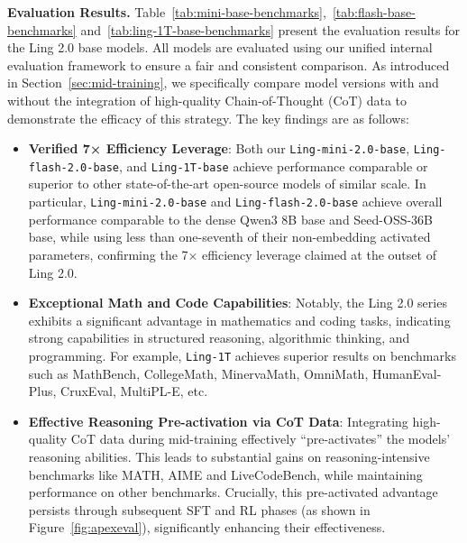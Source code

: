 {\bfseries Evaluation Results.} 
Table~\ref{tab:mini-base-benchmarks},~\ref{tab:flash-base-benchmarks} and~\ref{tab:ling-1T-base-benchmarks} present the evaluation results for the Ling 2.0 base models. All models are evaluated using our unified internal evaluation framework to ensure a fair and consistent comparison. 
As introduced in Section~\ref{sec:mid-training}, we specifically compare model versions with and without the integration of high-quality Chain-of-Thought (CoT) data to demonstrate the efficacy of this strategy. The key findings are as follows: 
\begin{itemize}
    \item \textbf{Verified 7× Efficiency Leverage}: 
    Both our \texttt{Ling-mini-2.0-base}, \texttt{Ling-flash-2.0-base}, and \texttt{Ling-1T-base} achieve performance comparable or superior to other state-of-the-art open-source models of similar scale. 
    In particular, \texttt{Ling-mini-2.0-base} and \texttt{Ling-flash-2.0-base} achieve overall performance comparable to the dense Qwen3 8B base and Seed-OSS-36B base, while using less than one-seventh of their non-embedding activated parameters, confirming the 7× efficiency leverage claimed at the outset of Ling 2.0.
    
    \item \textbf{Exceptional Math and Code Capabilities}: 
    Notably, the Ling 2.0 series exhibits a significant advantage in mathematics and coding tasks, indicating strong capabilities in structured reasoning, algorithmic thinking, and programming. For example, \texttt{Ling-1T} achieves superior results on benchmarks such as MathBench, CollegeMath, MinervaMath, OmniMath, HumanEval-Plus, CruxEval, MultiPL-E, etc. 
    \item \textbf{Effective Reasoning Pre-activation via CoT Data}: 
    Integrating high-quality CoT data during mid-training effectively ``pre-activates'' the models' reasoning abilities. This leads to substantial gains on reasoning-intensive benchmarks like MATH, AIME and LiveCodeBench, while maintaining performance on other benchmarks. Crucially, this pre-activated advantage persists through subsequent SFT and RL phases (as shown in Figure~\ref{fig:apexeval}), significantly enhancing their effectiveness.
\end{itemize}


